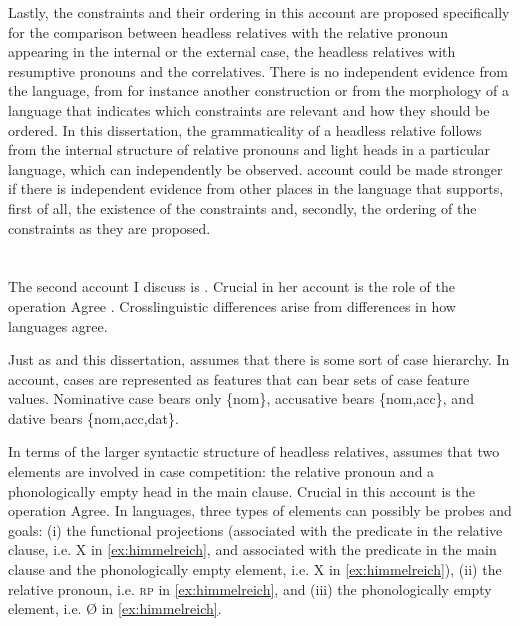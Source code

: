 Lastly, the constraints and their ordering in this account are proposed specifically for the comparison between headless relatives with the relative pronoun appearing in the internal or the external case, the headless relatives with resumptive pronouns and the correlatives. There is no independent evidence from the language, from for instance another construction or from the morphology of a language that indicates which constraints are relevant and how they should be ordered. In this dissertation, the grammaticality of a headless relative follows from the internal structure of relative pronouns and light heads in a particular language, which can independently be observed.  account could be made stronger if there is independent evidence from other places in the language that supports, first of all, the existence of the constraints and, secondly, the ordering of the constraints as they are proposed.



\section{\citealt{himmelreich2017}}

The second account I discuss is \citealt{himmelreich2017}. Crucial in her account is the role of the operation Agree \citep{chomsky2000,arregi2012}. Crosslinguistic differences arise from differences in how languages agree.

Just as \citet{vogel2002} and this dissertation, \citet{himmelreich2017} assumes that there is some sort of case hierarchy. In  account, cases are represented as features that can bear sets of case feature values. Nominative case bears only \{nom\}, accusative bears \{nom,acc\}, and dative bears \{nom,acc,dat\}.

In terms of the larger syntactic structure of headless relatives, \citet{himmelreich2017} assumes that two elements are involved in case competition: the relative pronoun and a phonologically empty head in the main clause. Crucial in this account is the operation Agree. In languages, three types of elements can possibly be probes and goals: (i) the functional projections (associated with the predicate in the relative clause, i.e. X in \ref{ex:himmelreich}, and associated with the predicate in the main clause and the phonologically empty element, i.e. X in \ref{ex:himmelreich}), (ii) the relative pronoun, i.e. \textsc{rp} in \ref{ex:himmelreich}, and (iii) the phonologically empty element, i.e. Ø in \ref{ex:himmelreich}. 

